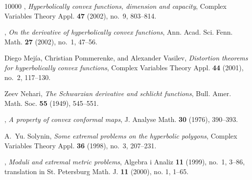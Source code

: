 \documentclass[12pt]{icgft}
\theoremstyle{definition}
\numberwithin{equation}{section}
\begin{document}
\begin{thebibliography}{10000}
\bysame, \emph{Hyperbolically convex functions, dimension and capacity},
  Complex Variables Theory Appl. \textbf{47} (2002), no.~9, 803--814.

\bysame, \emph{On the derivative of hyperbolically convex functions}, Ann.
  Acad. Sci. Fenn. Math. \textbf{27} (2002), no.~1, 47--56.

Diego Mej\'ia, Christian Pommerenke, and Alexander Vasil{\cprime}ev,
  \emph{Distortion theorems for hyperbolically convex functions}, Complex
  Variables Theory Appl. \textbf{44} (2001), no.~2, 117--130. 

Zeev Nehari, \emph{The {S}chwarzian derivative and schlicht functions}, Bull.
  Amer. Math. Soc. \textbf{55} (1949), 545--551. 

\bysame, \emph{A property of convex conformal maps}, J. Analyse Math.
  \textbf{30} (1976), 390--393. 


A.~Yu. Solynin, \emph{Some extremal problems on the hyperbolic polygons},
  Complex Variables Theory Appl. \textbf{36} (1998), no.~3, 207--231.

\bysame, \emph{Moduli and extremal metric problems}, Algebra i Analiz
\textbf{11} (1999), no.~1, 3--86, translation in St. Petersburg Math. J.
 \textbf{11} (2000), no. 1, 1--65. 

\end{thebibliography}
\end{document}
